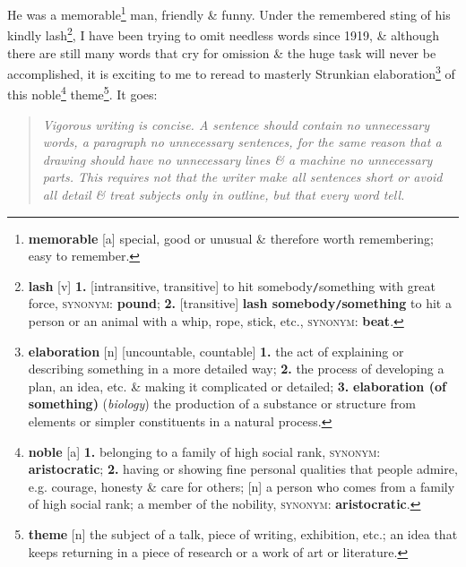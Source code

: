 \documentclass[oneside]{book}
\numberwithin{equation}{section}
\begin{document}
He was a memorable\footnote{\textbf{memorable} [a] special, good or unusual \& therefore worth remembering; easy to remember.} man, friendly \& funny. Under the remembered sting of his kindly lash\footnote{\textbf{lash} [v] \textbf{1.} [intransitive, transitive] to hit somebody\texttt{/}something with great force, \textsc{synonym}: \textbf{pound}; \textbf{2.} [transitive] \textbf{lash somebody\texttt{/}something} to hit a person or an animal with a whip, rope, stick, etc., \textsc{synonym}: \textbf{beat}.}, I have been trying to omit needless words since 1919, \& although there are still many words that cry for omission \& the huge task will never be accomplished, it is exciting to me to reread to masterly Strunkian elaboration\footnote{\textbf{elaboration} [n] [uncountable, countable] \textbf{1.} the act of explaining or describing something in a more detailed way; \textbf{2.} the process of developing a plan, an idea, etc. \& making it complicated or detailed; \textbf{3.} \textbf{elaboration (of something)} (\textit{biology}) the production of a substance or structure from elements or simpler constituents in a natural process.} of this noble\footnote{\textbf{noble} [a] \textbf{1.} belonging to a family of high social rank, \textsc{synonym}: \textbf{aristocratic}; \textbf{2.} having or showing fine personal qualities that people admire, e.g. courage, honesty \& care for others; [n] a person who comes from a family of high social rank; a member of the nobility, \textsc{synonym}: \textbf{aristocratic}.} theme\footnote{\textbf{theme} [n] the subject of a talk, piece of writing, exhibition, etc.; an idea that keeps returning in a piece of research or a work of art or literature.}. It goes:
\begin{quotation}
	\textit{Vigorous writing is concise. A sentence should contain no unnecessary words, a paragraph no unnecessary sentences, for the same reason that a drawing should have no unnecessary lines \& a machine no unnecessary parts. This requires not that the writer make all sentences short or avoid all detail \& treat subjects only in outline, but that every word tell.}
\end{quotation}
\end{document}
